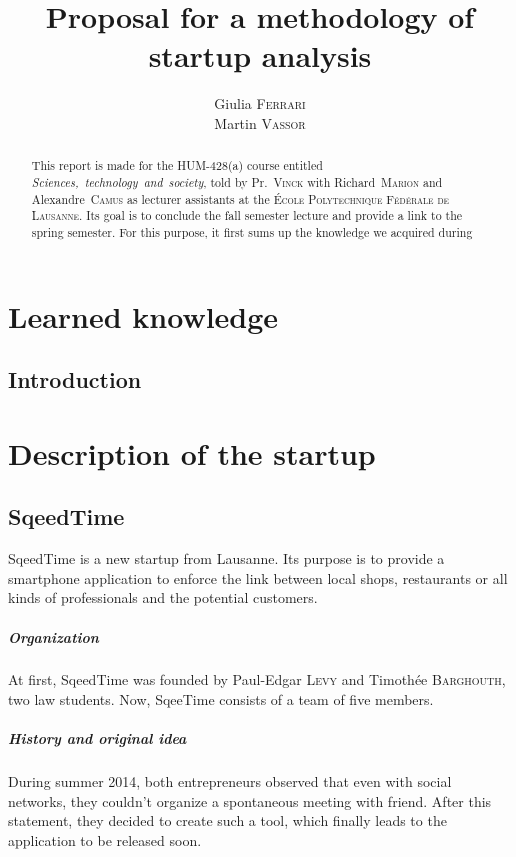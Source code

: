 \documentclass[twoside]{report}
\title{Proposal for a methodology of startup analysis}
\author{Giulia \textsc{Ferrari}\\Martin \textsc{Vassor}}
\begin{document}
\maketitle
\begin{abstract}
	This report is made for the HUM-428(a) course entitled \emph{Sciences,~technology~and~society}, told by Pr.~\textsc{Vinck} with Richard~\textsc{Marion} and Alexandre~\textsc{Camus} as lecturer assistants at the \textsc{École Polytechnique Fédérale de Lausanne}. Its goal is to conclude the fall semester lecture and provide a link to the spring semester. For this purpose, it first sums up the knowledge we acquired during 
\end{abstract}
\tableofcontents
\listoffigures
\listoftables
\chapter{Learned knowledge}
\section{Introduction}
\chapter{Description of the startup}
\section{SqeedTime}
SqeedTime is a new startup from Lausanne. Its purpose is to provide a smartphone application to enforce the link between local shops, restaurants or all kinds of professionals and the potential customers.



\paragraph{Organization}
At first, SqeedTime was founded by Paul-Edgar \textsc{Levy} and Timothée \textsc{Barghouth}, two law students. Now, SqeeTime consists of a team of five members.
\paragraph{History and original idea}
During summer 2014, both entrepreneurs observed that even with social networks, they couldn't organize a spontaneous meeting with friend. After this statement, they decided to create such a tool, which finally leads to the application to be released soon.
\end{document}
